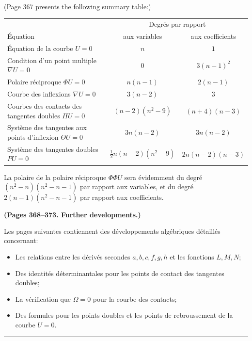 \documentclass[11pt,a4paper]{book}
\begin{document}
(Page 367 presents the following summary table:)

\begin{center}
\begin{tabular}{lcc}
\hline
 & \multicolumn{2}{c}{Degr\'{e}s par rapport} \\

\'{E}quation & aux variables & aux coefficients \\

\'{E}quation de la courbe $U = 0$ & $n$ & $1$ \\
Condition d'un point multiple $\nabla U = 0$ & $0$ & $3(n-1)^2$ \\
Polaire r\'{e}ciproque $\Phi U = 0$ & $n(n-1)$ & $2(n-1)$ \\
Courbe des inflexions $\nabla U = 0$ & $3(n-2)$ & $3$ \\
Courbes des contacts des tangentes doubles $\Pi U = 0$ & $(n-2)(n^2-9)$ & $(n+4)(n-3)$ \\
Syst\`{e}me des tangentes aux points d'inflexion $\Theta U = 0$ & $3n(n-2)$ & $3n(n-2)$ \\
Syst\`{e}me des tangentes doubles $PU = 0$ & $\tfrac{1}{2}n(n-2)(n^2-9)$ & $2n(n-2)(n-3)$ \\
\hline
\end{tabular}
\end{center}

La polaire de la polaire r\'{e}ciproque $\Phi\Phi U$ sera \'{e}videmment du degr\'{e}
$(n^2-n)(n^2-n-1)$ par rapport aux variables, et du degr\'{e} $2(n-1)(n^2-n-1)$
par rapport aux coefficients.

\bigskip

\textbf{(Pages 368--373. Further developments.)}

Les pages suivantes contiennent des d\'{e}veloppements alg\'{e}briques d\'{e}taill\'{e}s concernant:
\begin{itemize}
\item Les relations entre les d\'{e}riv\'{e}s secondes $a,b,c,f,g,h$ et les fonctions $L,M,N$;
\item Des identit\'{e}s d\'{e}terminantales pour les points de contact des tangentes doubles;
\item La v\'{e}rification que $\Omega = 0$ pour la courbe des contacts;
\item Des formules pour les points doubles et les points de rebroussement de la courbe $U=0$.
\end{itemize}

\bigskip
\hrule
\bigskip
\end{document}
